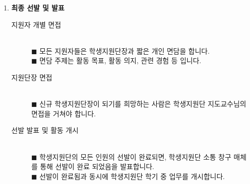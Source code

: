 \begin{enumerate}
    \item \textbf{최종 선발 및 발표}
    \begin{description}
        \item[지원자 개별 면접] \text{  }\\
        $\blacksquare$ 모든 지원자들은 학생지원단장과 짧은 개인 면담을 합니다.\\
        $\blacksquare$ 면담 주제는 활동 목표, 활동 의지, 관련 경험 등 입니다.
        \item[지원단장 면접] \text{  }\\
        $\blacksquare$ 신규 학생지원단장이 되기를 희망하는 사람은 학생지원단 지도교수님의 면접을 거쳐야 합니다.
        \item[선발 발표 및 활동 개시] \text{  }\\
        $\blacksquare$ 학생지원단의 모든 인원의 선발이 완료되면, 학생지원단 소통 창구 매체를 통해 선발이 완료 되었음을 발표합니다.\\
        $\blacksquare$ 선발이 완료됨과 동시에 학생지원단 학기 중 업무를 개시합니다.
    \end{description}
\end{enumerate}